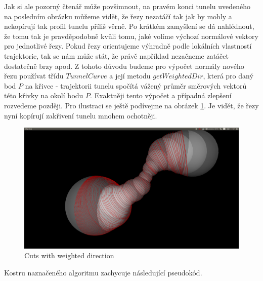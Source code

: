 Jak si ale pozorný čtenář může povšimnout, na pravém konci tunelu uvedeného na
posledním obrázku můžeme vidět, že řezy nezatáčí tak jak by mohly a nekopírují tak
profil tunelu příliš věrně. Po krátkém zamyšlení se dá nahlédnout, že tomu tak
je pravděpodobně kvůli tomu, jaké volíme výchozí normálové vektory pro jednotlivé
řezy. Pokud řezy orientujeme výhradně podle lokálních vlastností trajektorie,
tak se nám může stát, že právě například nezačneme zatáčet dostatečně brzy apod.
Z tohoto důvodu budeme pro výpočet normály nového řezu používat třídu
$ TunnelCurve $ a její metodu $ getWeightedDir $, která pro daný bod $ P $ na křivce
- trajektorii tunelu spočítá vážený průměr směrových vektorů této křivky na
okolí bodu $ P $. Exaktněji tento výpočet a případná zlepšení rozvedeme později.
Pro ilustraci se ještě podívejme na obrázek \ref{fig:weighted_dir}. Je vidět, že
řezy nyní kopírují zakřivení tunelu mnohem ochotněji.

\begin{figure}[ht]
    \centering
    \includegraphics[width=\textwidth]{img/weighted_dir.png}
    \caption{Cuts with weighted direction}
  \centering
  \label{fig:weighted_dir}
\end{figure}

Kostru naznačeného algoritmu zachycuje následující pseudokód.

